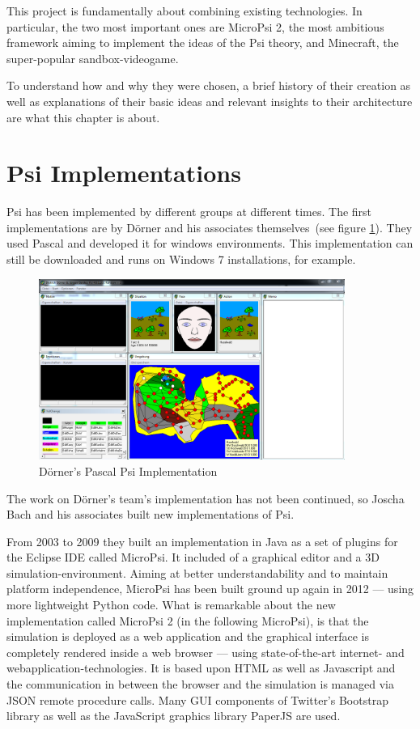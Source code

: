 
This project is fundamentally about combining existing technologies. In particular, the two most important ones are MicroPsi 2, the most ambitious framework aiming to implement the ideas of the Psi theory, and Minecraft, the super-popular sandbox-videogame.

To understand how and why they were chosen, a brief history of their creation as well as explanations of their basic ideas and relevant insights to their architecture are what this chapter is about.

    \section{Psi Implementations}
Psi has been implemented by different groups at different times. The first implementations are by Dörner and his associates themselves~(see figure \ref{psi_screen}). They used Pascal and developed it for windows environments. This implementation can still be downloaded and runs on Windows 7 installations, for example.

\begin{figure}[h]
  \centering
    \includegraphics[width=10cm]{graphics/psi_screen1}
  \caption{Dörner's Pascal Psi Implementation}
  \label{psi_screen}
\end{figure}

The work on Dörner's team's implementation has not been continued, so Joscha Bach and his associates built new implementations of Psi.

From 2003 to 2009 they built an implementation in Java as a set of plugins for the Eclipse IDE called MicroPsi. It included of a graphical editor and a 3D simulation-environment. Aiming at better understandability and to maintain platform independence, MicroPsi has been built ground up again in 2012 --- using more lightweight Python code. What is remarkable about the new implementation called MicroPsi 2 (in the following MicroPsi), is that the simulation is deployed as a web application and the graphical interface is completely rendered inside a web browser --- using state-of-the-art internet- and webapplication-technologies. It is based upon HTML as well as Javascript and the communication in between the browser and the simulation is managed via JSON remote procedure calls. Many GUI components of Twitter's Bootstrap library as well as the JavaScript graphics library PaperJS are used.~\cite{conf/agi/Bach12}

